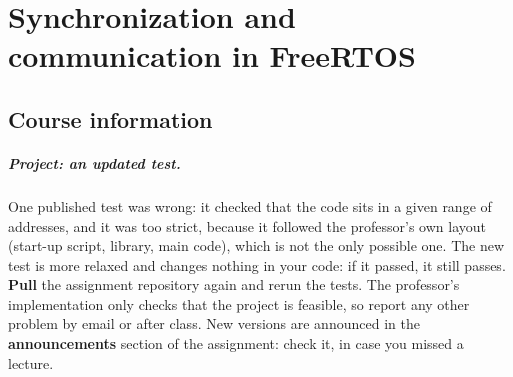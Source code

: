 \chapter{Synchronization and communication in FreeRTOS}
\makeatletter\let\wviiiSavedTextTop\@texttop\let\wviiiSavedTextBottom\@textbottom\makeatother
\raggedbottom

\section{Course information}
\paragraph{Project: an updated test.} One published test was wrong: it checked that the code sits in a given range of addresses, and it was too strict, because it followed the professor's own layout (start-up script, library, main code), which is not the only possible one. The new test is more relaxed and changes nothing in your code: if it passed, it still passes. \textbf{Pull} the assignment repository again and rerun the tests. The professor's implementation only checks that the project is feasible, so report any other problem by email or after class. New versions are announced in the \textbf{announcements} section of the assignment: check it, in case you missed a lecture.

